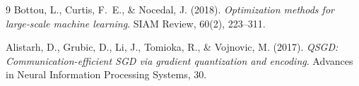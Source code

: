 \documentclass{article}
\begin{document}
\begin{thebibliography}{9}
Bottou, L., Curtis, F.~E., \& Nocedal, J. (2018). \emph{Optimization methods for
large‑scale machine learning}. SIAM Review, 60(2), 223–311.

Alistarh, D., Grubic, D., Li, J., Tomioka, R., \& Vojnovic, M. (2017).
\emph{QSGD: Communication-efficient SGD via gradient quantization and
encoding}. Advances in Neural Information Processing Systems, 30.
\end{thebibliography}
\end{document}

